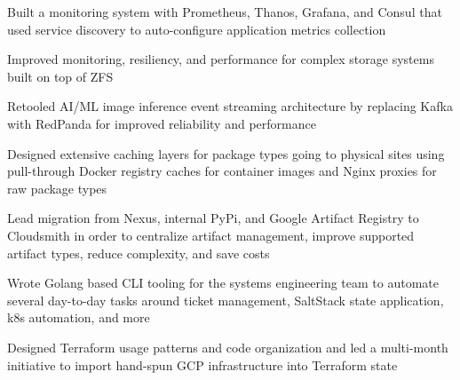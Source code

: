 \begin{cventries}
{\begin{cvitems}
        \item {Built a monitoring system with Prometheus, Thanos, Grafana, and Consul that used service discovery to auto-configure application metrics collection}
        \item {Improved monitoring, resiliency, and performance for complex storage systems built on top of ZFS}
        \item {Retooled AI/ML image inference event streaming architecture by replacing Kafka with RedPanda for improved reliability and performance}
        \item {Designed extensive caching layers for package types going to physical sites using pull-through Docker registry caches for container images and Nginx proxies for raw package types}
        \item {Lead migration from Nexus, internal PyPi, and Google Artifact Registry to Cloudsmith in order to centralize artifact management, improve supported artifact types, reduce complexity, and save costs}
        \item {Wrote Golang based CLI tooling for the systems engineering team to automate several day-to-day tasks around ticket management, SaltStack state application, k8s automation, and more}
        \item {Designed Terraform usage patterns and code organization and led a multi-month initiative to import hand-spun GCP infrastructure into Terraform state}
      \end{cvitems}
    }


\end{cventries}
